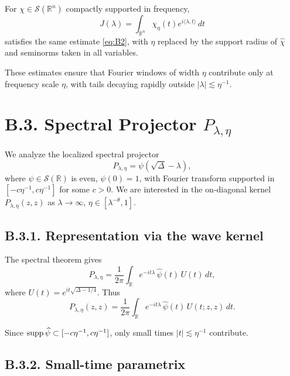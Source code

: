\begin{lemma}\label{lem:B2-multi}
For $\chi\in \mathcal{S}(\mathbb{R}^n)$ compactly supported in frequency,
\[
J(\lambda)=\int_{\mathbb{R}^n}\chi_\eta(t)e^{i\langle \lambda,t\rangle}\,dt
\]
satisfies the same estimate \eqref{eq:B2}, with $\eta$ replaced by the support radius of $\widehat\chi$ and seminorms taken in all variables.
\end{lemma}

\begin{remark}
These estimates ensure that Fourier windows of width $\eta$ contribute only at frequency scale $\eta$, with tails decaying rapidly outside $|\lambda|\lesssim \eta^{-1}$.
\end{remark}

\section{B.3. Spectral Projector $P_{\lambda,\eta}$}\label{sec:B3}

We analyze the localized spectral projector
\[
P_{\lambda,\eta}=\psi\!\left(\sqrt{\Delta}-\lambda\right),
\]
where $\psi\in \mathcal{S}(\mathbb{R})$ is even, $\psi(0)=1$, with Fourier transform supported in $[-c\eta^{-1},c\eta^{-1}]$ for some $c>0$.
We are interested in the on-diagonal kernel $P_{\lambda,\eta}(z,z)$ as $\lambda\to\infty$, $\eta\in[\lambda^{-\theta},1]$.

\subsection*{B.3.1. Representation via the wave kernel}

The spectral theorem gives
\[
P_{\lambda,\eta}=\frac{1}{2\pi}\int_{\mathbb{R}} e^{-it\lambda}\,\widehat{\psi}(t)\,U(t)\,dt,
\]
where $U(t)=e^{it\sqrt{\Delta-1/4}}$.
Thus
\begin{equation}\label{eq:B3-repr}
P_{\lambda,\eta}(z,z)=\frac{1}{2\pi}\int_{\mathbb{R}} e^{-it\lambda}\,\widehat{\psi}(t)\,U(t;z,z)\,dt.
\end{equation}

Since $\operatorname{supp} \widehat{\psi}\subset [-c\eta^{-1},c\eta^{-1}]$, only small times $|t|\lesssim \eta^{-1}$ contribute.

\subsection*{B.3.2. Small-time parametrix}

